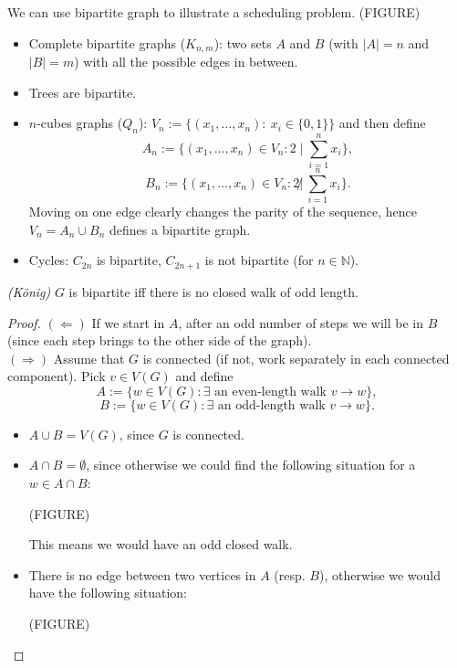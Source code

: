 \begin{example} We can use bipartite graph to illustrate a scheduling problem.
(FIGURE)
\end{example}

\begin{example}
\begin{itemize}
\item Complete bipartite graphs ($K_{n,m}$): two sets $A$ and $B$ (with $|A|=n$ and $|B|=m$) with all the possible edges in between.
\item Trees are bipartite. 
\item $n$-cubes graphs ($Q_n$): $V_n:=\{(x_1,\dots,x_n): \ x_i \in \{0,1\}\}$ and then define 
$$A_n:=\{(x_1,\dots,x_n) \in V_n: 2 \mid \sum_{i=1}^n x_i\},$$
$$B_n:=\{(x_1,\dots,x_n) \in V_n: 2 \not| \ \sum_{i=1}^n x_i\}.$$
Moving on one edge clearly changes the parity of the sequence, hence $V_n=A_n\cup B_n$ defines a bipartite graph.
\item Cycles: $C_{2n}$ is bipartite, $C_{2n+1}$ is not bipartite (for $n\in \mathbb{N}$).
\end{itemize}
\end{example}

\begin{theorem} \emph{(K\"{o}nig)}
$G$ is bipartite iff there is no closed walk of odd length.
\end{theorem}

\begin{proof}
\emph{$(\Leftarrow)$} If we start in $A$, after an odd number of steps we will be in $B$ (since each step brings to the other side of the graph).
\\ \emph{$(\Rightarrow)$} Assume that $G$ is connected (if not, work separately in each connected component). Pick $v\in V(G)$ and define
$$A:=\{w\in V(G): \exists \text{ an even-length walk } v\rightarrow w\},$$
$$B:=\{w\in V(G): \exists \text{ an odd-length walk } v\rightarrow w\}.$$
\begin{itemize}
\item $A\cup B=V(G)$, since $G$ is connected.
\item $A\cap B=\emptyset$, since otherwise we could find the following situation for a $w\in A\cap B$:

(FIGURE)

This means we would have an odd closed walk.
\item There is no edge between two vertices in $A$ (resp. $B$), otherwise we would have the following situation:

(FIGURE)

\end{itemize}
\end{proof}

